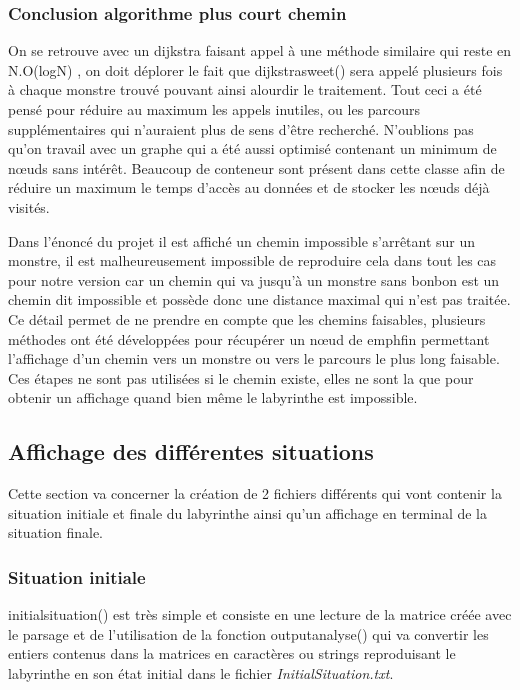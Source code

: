 \documentclass[12pt, oneside]{article}
\begin{document}
\subsubsection{Conclusion algorithme plus court chemin}
On se retrouve avec un dijkstra faisant appel à une méthode similaire qui reste en N.O(logN) , on doit déplorer le fait que dijkstra\textunderscore sweet() sera appelé plusieurs fois à chaque monstre trouvé pouvant ainsi alourdir le traitement. Tout ceci a été pensé pour réduire au maximum les appels inutiles, ou les parcours supplémentaires qui n’auraient plus de sens d’être recherché. N’oublions pas qu’on travail avec un graphe qui a été aussi optimisé contenant un minimum de nœuds sans intérêt. Beaucoup de conteneur sont présent dans cette classe afin de réduire un maximum le temps d’accès au données et de stocker les nœuds déjà visités. 

Dans l’énoncé du projet il est affiché un chemin impossible s’arrêtant sur un monstre, il est malheureusement impossible de reproduire cela dans tout les cas pour notre version car un chemin qui va jusqu’à un monstre sans bonbon est un chemin dit impossible et possède donc une distance maximal qui n’est pas traitée. Ce détail permet de ne prendre en compte que les chemins faisables, plusieurs méthodes ont été développées pour récupérer un nœud de emph{fin} permettant l’affichage d’un chemin vers un monstre ou vers le parcours le plus long faisable. Ces étapes ne sont pas utilisées si le chemin existe, elles ne sont la que pour obtenir un affichage quand bien même le labyrinthe est impossible. 
\subsection{Affichage des différentes situations}
Cette section va concerner la création de 2 fichiers différents qui vont contenir la situation initiale et finale du labyrinthe ainsi qu'un affichage en terminal de la situation finale.

\subsubsection{Situation initiale}
initial\textunderscore situation() est très simple et consiste en une lecture de la matrice créée avec le parsage et de l'utilisation de la fonction output\textunderscore analyse() qui va convertir les entiers contenus dans la matrices en caractères ou strings reproduisant le labyrinthe en son état initial dans le fichier \emph{InitialSituation.txt}.
\end{document}
